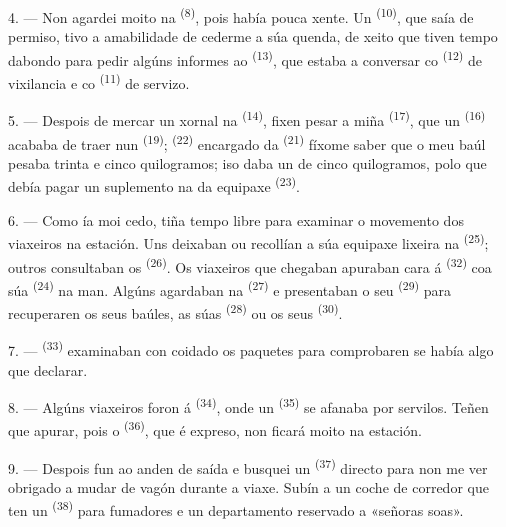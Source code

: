 4. --- Non agardei moito na  \textsuperscript{(8)}, pois había pouca
xente. Un  \textsuperscript{(10)}, que saía de permiso, tivo a
amabilidade de cederme a súa quenda, de xeito que tiven tempo dabondo para pedir algúns
informes ao  \textsuperscript{(13)}, que estaba a conversar
co  \textsuperscript{(12)} de vixilancia e co 
\textsuperscript{(11)} de servizo.

\VUsaut{3.0mm}

5. --- Despois de mercar un xornal na  \textsuperscript{(14)},
fixen pesar a miña  \textsuperscript{(17)}, que un 
\textsuperscript{(16)} acababa de traer nun 
\textsuperscript{(19)};  \textsuperscript{(22)} encargado da
 \textsuperscript{(21)} fíxome saber que o meu baúl pesaba trinta e
cinco quilogramos; iso daba un  de cinco quilogramos, polo que
debía pagar un suplemento na  da equipaxe \textsuperscript{(23)}.

6. --- Como ía moi cedo, tiña tempo libre para examinar o movemento dos viaxeiros na
estación. Uns deixaban ou recollían a súa equipaxe lixeira na 
\textsuperscript{(25)}; outros consultaban os 
\textsuperscript{(26)}. Os viaxeiros que chegaban apuraban cara á 
\textsuperscript{(32)} coa súa  \textsuperscript{(24)} na man. Algúns
agardaban na  \textsuperscript{(27)} e presentaban o seu
 \textsuperscript{(29)} para recuperaren os seus baúles, as súas
 \textsuperscript{(28)} ou os seus 
\textsuperscript{(30)}.

7. ---  \textsuperscript{(33)} examinaban con
coidado os paquetes para comprobaren se había algo que declarar.

8. --- Algúns viaxeiros foron á  \textsuperscript{(34)}, onde un
 \textsuperscript{(35)} se afanaba por servilos. Teñen que apurar,
pois o  \textsuperscript{(36)}, que é expreso, non ficará moito na
estación.

9. --- Despois fun ao anden de saída e busquei un 
\textsuperscript{(37)} directo para non me ver obrigado a mudar de vagón durante a
viaxe. Subín a un coche de corredor que ten un 
\textsuperscript{(38)} para fumadores e un departamento reservado a «señoras soas».


